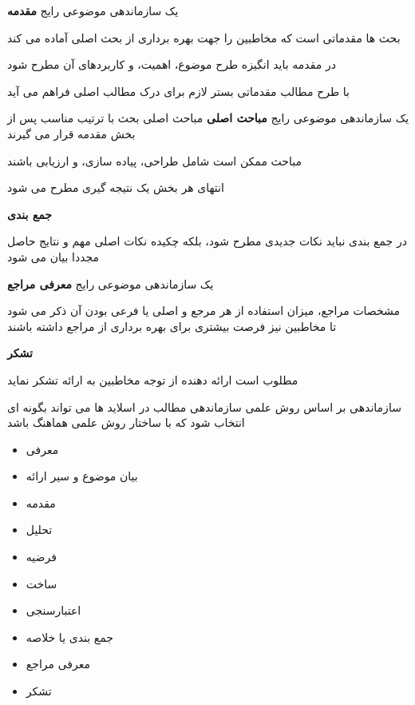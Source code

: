 \documentclass[14pt]{beamer}
\makeatletter
\newcommand{\rtlist}{\raggedleft\rightskip\@totalleftmargin}
\newcommand{\framefontsizelarge}{\fontsize{18pt}{0pt}\selectfont}
\newcommand{\frametitlefontsize}{\fontsize{20pt}{0pt}\selectfont}
\makeatother
\begin{document}
\begin{persian}
	\begin{frame}[plain]{\frametitlefontsize یک سازماندهی موضوعی رایج}
		\framefontsizelarge
		\textbf{مقدمه}
		
		بحث ها مقدماتی است که مخاطبین را جهت بهره برداری از بحث اصلی آماده می کند
		
		در مقدمه باید انگیزه طرح موضوع، اهمیت، و کاربردهای آن مطرح شود
		
		با طرح مطالب مقدماتی بستر لازم برای درک مطالب اصلی فراهم می آید
	\end{frame}	
	
	\begin{frame}[plain]{\frametitlefontsize یک سازماندهی موضوعی رایج}
		\framefontsizelarge
		\textbf{مباحث اصلی}
		مباحث اصلی بحث با ترتیب مناسب پس از بخش مقدمه قرار می گیرند
		
		مباحث ممکن است شامل طراحی، پیاده سازی، و ارزیابی باشند
		
		انتهای هر بخش یک نتیجه گیری مطرح می شود
		
		\textbf{جمع بندی}
		
		در جمع بندی نباید نکات جدیدی مطرح شود، بلکه چکیده نکات اصلی مهم و نتایج حاصل مجددا بیان می شود
	\end{frame}	
	
	\begin{frame}[plain]{\frametitlefontsize یک سازماندهی موضوعی رایج}
		\framefontsizelarge
		\textbf{معرفی مراجع}
		
		مشخصات مراجع، میزان استفاده از هر مرجع و اصلی یا فرعی بودن آن ذکر می شود تا مخاطبین نیز فرصت بیشتری برای بهره برداری از مراجع داشته باشند
		
		\textbf{تشکر}
		
		مطلوب است ارائه دهنده از توجه مخاطبین به ارائه تشکر نماید
	\end{frame}	
	
	\begin{frame}[plain]{\frametitlefontsize سازماندهی بر اساس روش علمی}
		\framefontsizelarge
		سازماندهی مطالب در اسلاید ها می تواند بگونه ای انتخاب شود که با ساختار روش علمی هماهنگ باشد
		
		\begin{itemize}\rtlist
			\item معرفی
			\item بیان موضوع و سیر ارائه
			\item مقدمه
			\item تحلیل
			\item فرضیه
			\item ساخت
			\item اعتبارسنجی
			\item جمع بندی یا خلاصه
			\item معرفی مراجع
			\item تشکر
		\end{itemize}
	\end{frame}	

\end{persian}
\end{document}
